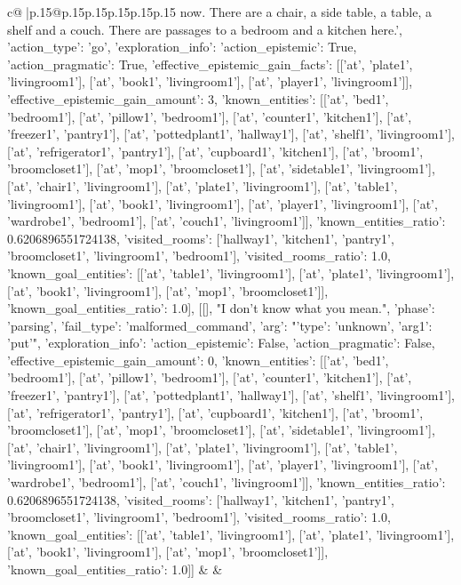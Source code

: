 \documentclass{article}
\begin{document}
{\begin{supertabular}{c@{$\;$}|p{.15\linewidth}@{}p{.15\linewidth}p{.15\linewidth}p{.15\linewidth}p{.15\linewidth}p{.15\linewidth}}
{{{now. There are a chair, a side table, a table, a shelf and a couch. There are passages to a bedroom and a kitchen here.', {'action_type': 'go', 'exploration_info': {'action_epistemic': True, 'action_pragmatic': True, 'effective_epistemic_gain_facts': [['at', 'plate1', 'livingroom1'], ['at', 'book1', 'livingroom1'], ['at', 'player1', 'livingroom1']], 'effective_epistemic_gain_amount': 3, 'known_entities': [['at', 'bed1', 'bedroom1'], ['at', 'pillow1', 'bedroom1'], ['at', 'counter1', 'kitchen1'], ['at', 'freezer1', 'pantry1'], ['at', 'pottedplant1', 'hallway1'], ['at', 'shelf1', 'livingroom1'], ['at', 'refrigerator1', 'pantry1'], ['at', 'cupboard1', 'kitchen1'], ['at', 'broom1', 'broomcloset1'], ['at', 'mop1', 'broomcloset1'], ['at', 'sidetable1', 'livingroom1'], ['at', 'chair1', 'livingroom1'], ['at', 'plate1', 'livingroom1'], ['at', 'table1', 'livingroom1'], ['at', 'book1', 'livingroom1'], ['at', 'player1', 'livingroom1'], ['at', 'wardrobe1', 'bedroom1'], ['at', 'couch1', 'livingroom1']], 'known_entities_ratio': 0.6206896551724138, 'visited_rooms': ['hallway1', 'kitchen1', 'pantry1', 'broomcloset1', 'livingroom1', 'bedroom1'], 'visited_rooms_ratio': 1.0, 'known_goal_entities': [['at', 'table1', 'livingroom1'], ['at', 'plate1', 'livingroom1'], ['at', 'book1', 'livingroom1'], ['at', 'mop1', 'broomcloset1']], 'known_goal_entities_ratio': 1.0}}], [[], "I don't know what you mean.", {'phase': 'parsing', 'fail_type': 'malformed_command', 'arg': "{'type': 'unknown', 'arg1': 'put'}", 'exploration_info': {'action_epistemic': False, 'action_pragmatic': False, 'effective_epistemic_gain_amount': 0, 'known_entities': [['at', 'bed1', 'bedroom1'], ['at', 'pillow1', 'bedroom1'], ['at', 'counter1', 'kitchen1'], ['at', 'freezer1', 'pantry1'], ['at', 'pottedplant1', 'hallway1'], ['at', 'shelf1', 'livingroom1'], ['at', 'refrigerator1', 'pantry1'], ['at', 'cupboard1', 'kitchen1'], ['at', 'broom1', 'broomcloset1'], ['at', 'mop1', 'broomcloset1'], ['at', 'sidetable1', 'livingroom1'], ['at', 'chair1', 'livingroom1'], ['at', 'plate1', 'livingroom1'], ['at', 'table1', 'livingroom1'], ['at', 'book1', 'livingroom1'], ['at', 'player1', 'livingroom1'], ['at', 'wardrobe1', 'bedroom1'], ['at', 'couch1', 'livingroom1']], 'known_entities_ratio': 0.6206896551724138, 'visited_rooms': ['hallway1', 'kitchen1', 'pantry1', 'broomcloset1', 'livingroom1', 'bedroom1'], 'visited_rooms_ratio': 1.0, 'known_goal_entities': [['at', 'table1', 'livingroom1'], ['at', 'plate1', 'livingroom1'], ['at', 'book1', 'livingroom1'], ['at', 'mop1', 'broomcloset1']], 'known_goal_entities_ratio': 1.0}}]] 
	  } 
	   } 
	   } 
	 & & \\ 
 


\end{supertabular}}
\end{document}
